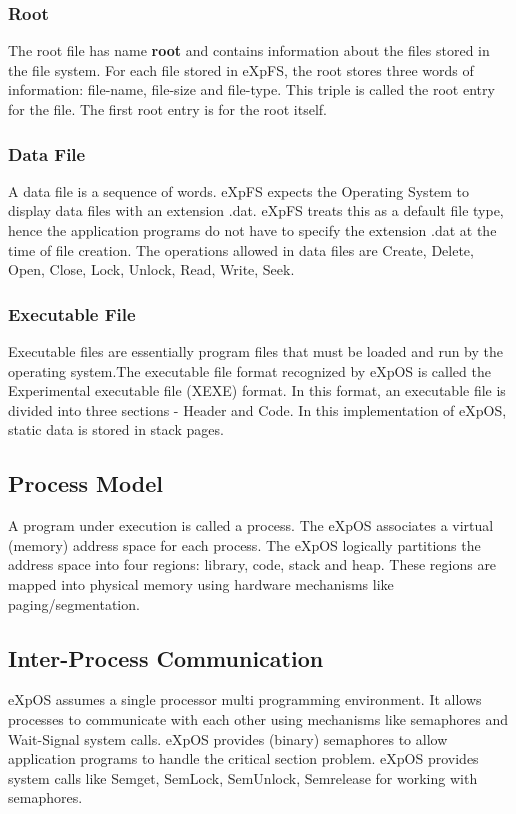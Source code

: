 \documentclass[10pt]{article}
\begin{document}
\subsubsection{Root}
The root file has name \textbf {root} and contains information about the files stored in the file system. For each file stored in eXpFS, the root stores three words of information: file-name, file-size and file-type. This triple is called the root entry for the file. The first root entry is for the root itself.  
\subsubsection{Data File}
A data file is a sequence of words. eXpFS expects the Operating System to display data files with an extension .dat.   eXpFS treats this as a default file type, hence the application programs do not have to specify the extension .dat at the time of file creation.  
The operations allowed in data files are Create, Delete, Open, Close, Lock, Unlock, Read, Write, Seek.
\subsubsection{Executable File}
Executable files are essentially program files that must be loaded and run by the operating system.The executable file format recognized by eXpOS is called the Experimental executable file (XEXE) format. In this format, an executable file is divided into three sections - Header and Code. In this implementation of eXpOS, static data is stored in stack pages.
\subsection{Process Model}
A program under execution is called a process. The eXpOS associates a virtual (memory) address space for each process. The eXpOS logically partitions the address space into four regions: library, code, stack and heap. These regions are mapped into physical memory using hardware mechanisms like paging/segmentation.
\subsection{Inter-Process Communication}
eXpOS assumes a single processor multi programming environment. It allows processes to communicate with each other using mechanisms like semaphores and Wait-Signal system calls.
eXpOS provides (binary) semaphores to allow application programs to handle the critical section problem. eXpOS provides system calls like Semget, SemLock, SemUnlock, Semrelease for working with semaphores.
\end{document}
